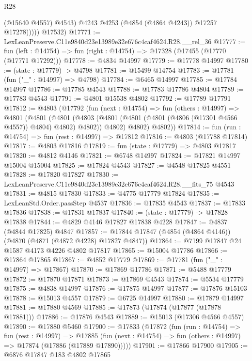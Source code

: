 \begin{lexlean}{R28}
\begin{coremodule}
                  (@15640 @4557)
                  @4543)
                @4243
                @4253
                (@4854 (@4864 @4243))
                @17257
                @17278)))))
      @17532)
@17771 := LexLeanPreserve.C11e9840d23e13989e32e676c4caf4624.R28.__rel_36
@17777 := fun (left : @14754) => fun (right : @14754) => @17328 (@17455 (@17770 (@17771 @17292)))
@17778 := @4834 @14997
@17779 := @17778 @14997
@17780 := (state : @17779) -> @4798
@17781 := @15499 @14754
@17783 := @17781 (fun ("_" : @14997) => @4798)
@17784 := @6465 @14997
@17785 := @17784 @14997
@17786 := @17785 @4543
@17788 := @17783 @17786 @4804
@17789 := @17783 @4543
@17791 := @4801 @15538 @4802
@17792 := @17789 @17791
@17812 := @4803
    (@17792
      (fun (next : @14754) =>
      fun (others : @14997) =>
      @4801
        (@4801
          (@4801
            (@4803 (@4801 (@4801 (@4801 (@4806 (@17301 @4566 @4557)) @4804) @4802) @4802))
            @4802)
          @4802)
        @4802))
@17814 := fun (run : @14754) => fun (rest : @14997) => @17812
@17816 := @4803 (@17788 @17814)
@17817 := @4803 @17816
@17819 := fun (state : @17779) => @4803 @17817
@17820 := @4812 @4146
@17821 := @6748 @14997
@17824 := @17821 @14997 @15004 @15004
@17825 := @17824 @4543
@17827 := @4548 @17825 @4551
@17828 := @17820 @17827
@17830 := LexLeanPreserve.C11e9840d23e13989e32e676c4caf4624.R28.__fits_75 @4543
@17831 := @4815 @17830
@17833 := @4775 @17779 @17824
@17835 := LexLeanStd.Order.passStep @4537
@17836 := @17835 @4543
@17837 := @17833 @17836
@17838 := @17831 @17837
@17840 := (state : @17779) -> @17828 @17838
@17844 := @4829 @4146 @17827 @17838 @4228
@17847 := @4837 (@4844 @17825) @4847
@17857 := @17844 @17847 (@4854 (@4864 @4146)) (@4870 (@4871 (@4872 @4228) @17827 @4847))
@17864 := @7199 @17847 @24 @1587 @4173 @4226 @4802 @17817
@17865 := @15004 @17786
@17866 := @17864 @17865
@17867 := @4852 @17779
@17869 := @17781 (fun ("_" : @14997) => @17867)
@17870 := @17869 @17786
@17871 := @5488 @17779
@17872 := @17870 @17871
@17873 := @17869 @4543
@17874 := @5534 @17779
@17875 := @4838 @14997
@17876 := @17875 @14997
@17877 := @17876 @15103
@17878 := @15013 @4557
@17879 := @6725 @14997
@17880 := @17879 @14997
@17881 := @17880 @4569
@17885 := @17873 (@17874 (@17877 (@17878 @17881)))
@17886 := @17876 @4543
@17889 := @15013 (@17306 @4566 @4557)
@17890 := @17880 @5460
@17900 := @17833
    (@17872
      (fun (run : @14754) =>
      fun (rest : @14997) =>
      @17885 (fun (next : @14754) => fun (others : @14997) => @17874 (@17886 (@17889 @17890)))))
@17901 := @17866 @17900
@17905 := @6876 @17847 @183 @4802 @17865

\end{coremodule}
\end{lexlean}
